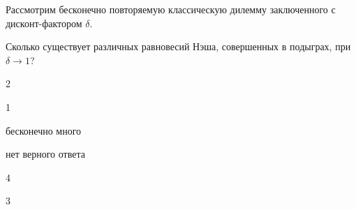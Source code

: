 
\begin{question}
Рассмотрим бесконечно повторяемую классическую дилемму заключенного с
дисконт-фактором \(\delta\).

Сколько существует различных равновесий Нэша, совершенных в подыграх,
при \(\delta \to 1\)?
\begin{answerlist}
  \item 2
  \item 1
  \item бесконечно много
  \item нет верного ответа
  \item 4
  \item 3
\end{answerlist}
\end{question}


